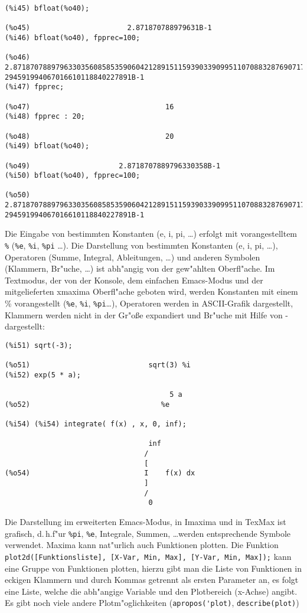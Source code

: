 \documentclass[ngerman,12pt,a4paper]{article}
\begin{document}
\scriptsize
\begin{verbatim}
(%i45) bfloat(%o40);

(%o45)                       2.871870788979631B-1
(%i46) bfloat(%o40), fpprec=100;

(%o46) 2.871870788979633035608585359060421289151159390339099511070883287690717#
294591994067016610118840227891B-1
(%i47) fpprec;

(%o47)                                16
(%i48) fpprec : 20;

(%o48)                                20
(%i49) bfloat(%o40);

(%o49)                     2.8718707889796330358B-1
(%i50) bfloat(%o40), fpprec=100;

(%o50) 2.871870788979633035608585359060421289151159390339099511070883287690717#
294591994067016610118840227891B-1
\end{verbatim}
\normalsize

Die Eingabe von bestimmten Konstanten (e, i, pi, \ldots) erfolgt mit
vorangestelltem \verb|%| (\verb|%e|, \verb|%i|, \verb|%pi| \ldots).
Die Darstellung von bestimmten Konstanten (e, i, pi, \ldots), Operatoren (Summe, Integral, Ableitungen, \ldots) und anderen Symbolen (Klammern, Br"uche, \ldots) ist abh"angig von der gew"ahlten Oberfl"ache. Im Textmodus, der von der Konsole, dem einfachen Emacs-Modus und der mitgelieferten xmaxima Oberfl"ache geboten wird, werden Konstanten mit einem \% vorangestellt (\verb|%e|, \verb|%i|, \verb|%pi|\ldots), Operatoren werden in ASCII-Grafik dargestellt, Klammern werden nicht in der Gr"o{\ss}e expandiert und Br"uche mit Hilfe von - dargestellt:

\scriptsize
\begin{verbatim}
(%i51) sqrt(-3);

(%o51)                            sqrt(3) %i
(%i52) exp(5 * a);

                                       5 a
(%o52)                               %e

(%i54) (%i54) integrate( f(x) , x, 0, inf);

                                  inf
                                 /
                                 [
(%o54)                           I    f(x) dx
                                 ]
                                 /
                                  0
\end{verbatim}
\normalsize

Die Darstellung im erweiterten Emacs-Modus, in Imaxima und in TexMax ist grafisch, d.\,h.\@ f"ur \verb|%pi|, \verb|%e|, Integrale, Summen, \ldots werden entsprechende Symbole verwendet.
Maxima kann nat"urlich auch Funktionen plotten. Die Funktion \verb|plot2d([Funktionsliste], [X-Var, Min, Max], [Y-Var, Min, Max]);| kann eine Gruppe von Funktionen plotten, hierzu gibt man die Liste von Funktionen in eckigen Klammern und durch Kommas getrennt als ersten Parameter an, es folgt eine Liste, welche die abh"angige Variable und den Plotbereich (x-Achse) angibt. Es gibt noch viele andere Plotm"oglichkeiten (\verb|apropos('plot)|, \verb|describe(plot)|)
\end{document}
